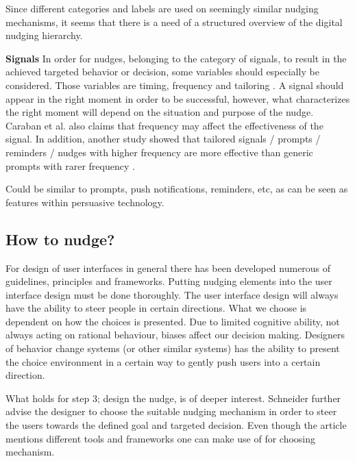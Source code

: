 Since different categories and labels are used on seemingly similar nudging mechanisms, it seems that there is a need of a structured overview of the digital nudging hierarchy. 

\textbf{Signals }
In order for nudges, belonging to the category of signals, to result in the achieved targeted  behavior or decision, some variables should especially be considered. Those variables are timing, frequency and tailoring \cite{caraban_23_2019}. A signal should appear in the right moment in order to be successful, however, what characterizes the right moment will depend on the situation and purpose of the nudge. Caraban et al. also claims that frequency may affect the effectiveness of the signal. In addition, another study showed that tailored signals / prompts / reminders / nudges with higher frequency are more effective than generic prompts with rarer frequency \cite{fry_periodic_2009}. 

Could be similar to prompts, push notifications, reminders, etc, as can be seen as features within persuasive technology. 

\subsection{How to nudge?}
For design of user interfaces in general there has been developed numerous of guidelines, principles and frameworks. Putting nudging elements into the user interface design must be done thoroughly. The user interface design will always have the ability to steer people in certain directions\cite{schneider_digital_2018}. 
What we choose is dependent on how the choices is presented. Due to limited cognitive ability, not always acting on rational behaviour, biases affect our decision making. Designers of behavior change systems (or other similar systems) has the ability to present the choice environment in a certain way to gently push users into a certain direction. 

What holds for step 3; design the nudge, is of deeper interest. Schneider further advise the designer to choose the suitable nudging mechanism in order to steer the users towards the defined goal and targeted decision. Even though the article mentions different tools and frameworks one can make use of for choosing mechanism. 

